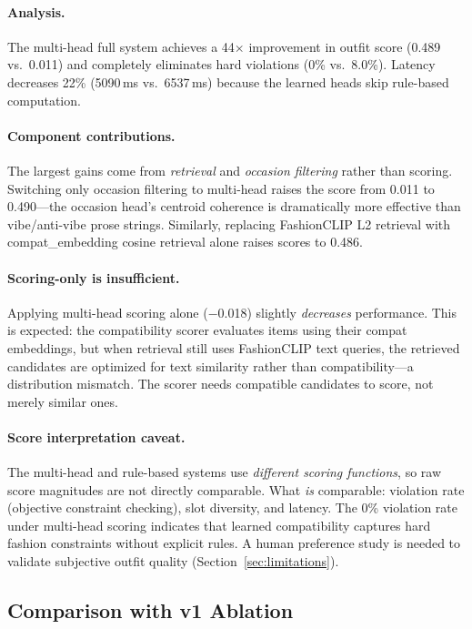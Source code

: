 \documentclass[10pt,twocolumn]{article}
\begin{document}
\paragraph{Analysis.}

The multi-head full system achieves a 44$\times$ improvement in outfit
score (0.489 vs.\ 0.011) and completely eliminates hard violations (0\%
vs.\ 8.0\%).  Latency decreases 22\% (5090\,ms vs.\ 6537\,ms) because
the learned heads skip rule-based computation.

\paragraph{Component contributions.}
The largest gains come from \emph{retrieval} and \emph{occasion filtering}
rather than scoring.  Switching only occasion filtering to multi-head
raises the score from 0.011 to 0.490---the occasion head's centroid
coherence is dramatically more effective than vibe/anti-vibe prose
strings.  Similarly, replacing FashionCLIP L2 retrieval with
compat\_embedding cosine retrieval alone raises scores to 0.486.

\paragraph{Scoring-only is insufficient.}
Applying multi-head scoring alone ($-$0.018) slightly \emph{decreases}
performance.  This is expected: the compatibility scorer evaluates items
using their compat embeddings, but when retrieval still uses FashionCLIP
text queries, the retrieved candidates are optimized for text similarity
rather than compatibility---a distribution mismatch.  The scorer needs
compatible candidates to score, not merely similar ones.

\paragraph{Score interpretation caveat.}
The multi-head and rule-based systems use \emph{different scoring
functions}, so raw score magnitudes are not directly comparable.  What
\emph{is} comparable: violation rate (objective constraint checking),
slot diversity, and latency.  The 0\% violation rate under multi-head
scoring indicates that learned compatibility captures hard fashion
constraints without explicit rules.  A human preference study is needed
to validate subjective outfit quality (Section~\ref{sec:limitations}).

\subsection{Comparison with v1 Ablation}
\end{document}
